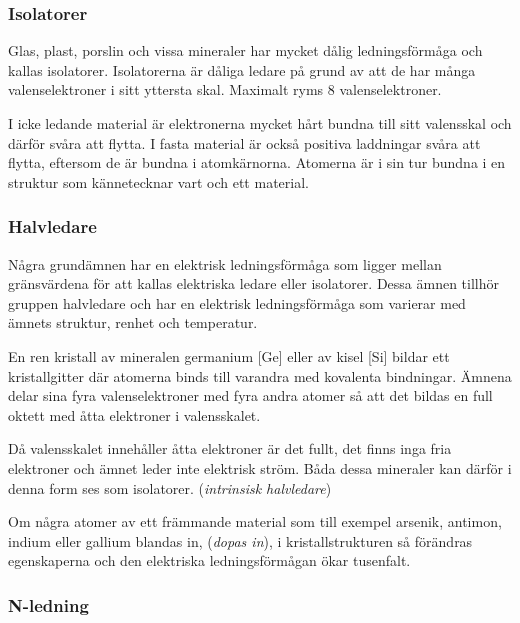 \subsubsection{Isolatorer}
\label{isolator}

Glas, plast, porslin och vissa mineraler har mycket dålig ledningsförmåga och
kallas isolatorer.
Isolatorerna är dåliga ledare på grund av att de har många valenselektroner i
sitt yttersta skal.
Maximalt ryms 8 valenselektroner.

I icke ledande material är elektronerna mycket hårt bundna till sitt valensskal
och därför svåra att flytta.
I fasta material är också positiva laddningar svåra att flytta, eftersom de är
bundna i atomkärnorna.
Atomerna är i sin tur bundna i en struktur som kännetecknar vart och ett
material.

\subsubsection{Halvledare}
\label{halvledare}

Några grundämnen har en elektrisk ledningsförmåga som ligger mellan gränsvärdena
för att kallas elektriska ledare eller isolatorer.
Dessa ämnen tillhör gruppen halvledare och har en elektrisk ledningsförmåga som
varierar med ämnets struktur, renhet och temperatur.

En ren kristall av mineralen germanium [Ge] eller av kisel [Si] bildar ett
kristallgitter där atomerna binds till varandra med kovalenta bindningar.
Ämnena delar sina fyra valenselektroner med fyra andra atomer så att det
bildas en full oktett med åtta elektroner i valensskalet.

Då valensskalet innehåller åtta elektroner är det fullt, det finns inga fria
elektroner och ämnet leder inte elektrisk ström.
Båda dessa mineraler kan därför i denna form ses som isolatorer.
(\emph{intrinsisk halvledare})

Om några atomer av ett främmande material som till exempel arsenik, antimon,
indium eller gallium blandas in, (\emph{dopas in}), i kristallstrukturen så
förändras egenskaperna och den elektriska ledningsförmågan ökar tusenfalt.

\subsubsection{N-ledning}

